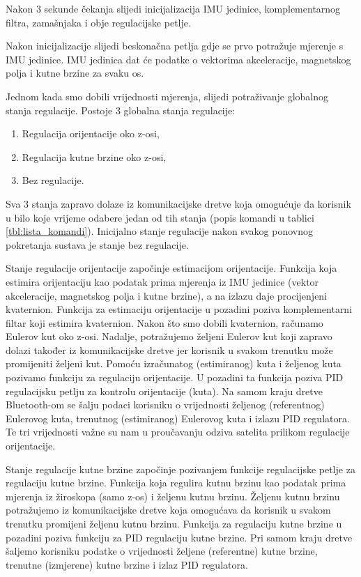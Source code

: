 \documentclass[times, utf8, diplomski, numeric]{templates/template}
\begin{document}
{{{{                Nakon 3 sekunde čekanja slijedi inicijalizacija IMU jedinice, komplementarnog filtra, zamašnjaka i obje regulacijske petlje.

                Nakon inicijalizacije slijedi beskonačna petlja gdje se prvo potražuje mjerenje s IMU jedinice. IMU jedinica dat će podatke o vektorima akceleracije, magnetskog polja i kutne brzine za svaku os. 

                Jednom kada smo dobili vrijednosti mjerenja, slijedi potraživanje globalnog stanja regulacije. Postoje 3 globalna stanja regulacije: 

                \begin{enumerate}
                    \item Regulacija orijentacije oko z-osi,
                    \item Regulacija kutne brzine oko z-osi,
                    \item Bez regulacije.
                \end{enumerate}

                Sva 3 stanja zapravo dolaze iz komunikacijske dretve koja omogućuje da korisnik u bilo koje vrijeme odabere jedan od tih stanja (popis komandi u tablici \ref{tbl:lista_komandi}). Inicijalno stanje regulacije nakon svakog ponovnog pokretanja sustava je stanje bez regulacije.

                Stanje regulacije orijentacije započinje estimacijom orijentacije. Funkcija koja estimira orijentaciju kao podatak prima mjerenja iz IMU jedinice (vektor akceleracije, magnetskog polja i kutne brzine), a na izlazu daje procijenjeni kvaternion. Funkcija za estimaciju orijentacije u pozadini poziva komplementarni filtar koji estimira kvaternion. Nakon što smo dobili kvaternion, računamo Eulerov kut oko z-osi. Nadalje, potražujemo željeni Eulerov kut koji zapravo dolazi također iz komunikacijske dretve jer korisnik u svakom trenutku može promijeniti željeni kut. Pomoću izračunatog (estimiranog) kuta i željenog kuta pozivamo funkciju za regulaciju orijentacije. U pozadini ta funkcija poziva PID regulacijsku petlju za kontrolu orijentacije (kuta). Na samom kraju dretve Bluetooth-om se šalju podaci korisniku o vrijednosti željenog (referentnog) Eulerovog kuta, trenutnog (estimiranog) Eulerovog kuta i izlazu PID regulatora. Te tri vrijednosti važne su nam u proučavanju odziva satelita prilikom regulacije orijentacije. 

                Stanje regulacije kutne brzine započinje pozivanjem funkcije regulacijske petlje za regulaciju kutne brzine. Funkcija koja regulira kutnu brzinu kao podatak prima mjerenja iz žiroskopa (samo z-os) i željenu kutnu brzinu. Željenu kutnu brzinu potražujemo iz komunikacijske dretve koja omogućava da korisnik u svakom trenutku promijeni željenu kutnu brzinu. Funkcija za regulaciju kutne brzine u pozadini poziva funkciju za PID regulaciju kutne brzine. Pri samom kraju dretve šaljemo korisniku podatke o vrijednosti željene (referentne) kutne brzine, trenutne (izmjerene) kutne brzine i izlaz PID regulatora. 

}}}}
\end{document}
